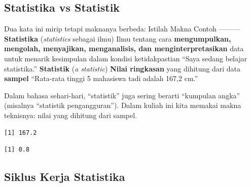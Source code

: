 \documentclass[
  indonesian,
  letterpaper,
]{book}
\newenvironment{Shaded}{\begin{snugshade}}{\end{snugshade}}
\newcommand{\CommentTok}[1]{\textcolor[rgb]{0.37,0.37,0.37}{#1}}
\newcommand{\FunctionTok}[1]{\textcolor[rgb]{0.28,0.35,0.67}{#1}}
\newcommand{\NormalTok}[1]{\textcolor[rgb]{0.00,0.23,0.31}{#1}}
\newcommand{\SpecialCharTok}[1]{\textcolor[rgb]{0.37,0.37,0.37}{#1}}
\begin{document}
\subsection{Statistika vs Statistik}\label{statistika-vs-statistik}

Dua kata ini mirip tetapi maknanya berbeda: \textbar{} Istilah
\textbar{} Makna \textbar{} Contoh \textbar{}
\textbar---\textbar---\textbar---\textbar{} \textbar{}
\textbf{Statistika} (\emph{statistics} sebagai ilmu) \textbar{} Ilmu
tentang cara \textbf{mengumpulkan, mengolah, menyajikan, menganalisis,
dan menginterpretasikan} data untuk menarik kesimpulan dalam kondisi
ketidakpastian \textbar{} ``Saya sedang belajar statistika.'' \textbar{}
\textbar{} \textbf{Statistik} (\emph{a statistic}) \textbar{}
\textbf{Nilai ringkasan} yang dihitung dari data \textbf{sampel}
\textbar{} ``Rata-rata tinggi 5 mahasiswa tadi adalah 167,2 cm.''
\textbar{}

Dalam bahasa sehari-hari, ``statistik'' juga sering berarti ``kumpulan
angka'' (misalnya ``statistik pengangguran''). Dalam kuliah ini kita
memakai makna teknisnya: nilai yang dihitung dari sampel.

\begin{Shaded}
\end{Shaded}

\begin{verbatim}
[1] 167.2
\end{verbatim}

\begin{Shaded}
\end{Shaded}

\begin{verbatim}
[1] 0.8
\end{verbatim}

\subsection{Siklus Kerja Statistika}\label{siklus-kerja-statistika}
\end{document}
